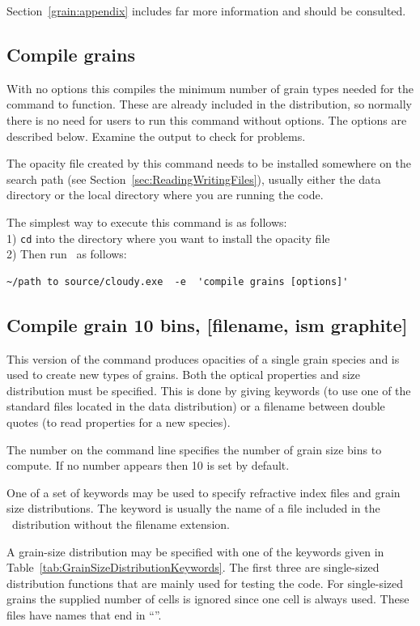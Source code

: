 Section~\ref{grain:appendix} includes far
more information and should be consulted.

\subsection{Compile grains}

With no options this compiles the minimum number of grain types needed
for the  command to function. These are already included
in the distribution, so normally there is no need for users to run this
command without options. The options are described below.
Examine the output to check
for problems. 

The opacity file created by this command needs to be installed somewhere
on the search path (see Section~\ref{sec:ReadingWritingFiles}), usually either
the data directory or the local directory where you are running the code.

The simplest way to execute this command is as follows:\\
1) \texttt{cd} into the directory where you want to install the opacity file\\
2) Then run \Cloudy\ as follows:
\begin{verbatim}
~/path to source/cloudy.exe  -e  'compile grains [options]'
\end{verbatim}

\subsection{Compile grain 10 bins, [filename, ism graphite]}

This version of the command produces opacities of a single grain species
and is used to create new types of grains.
Both the optical properties
and size distribution must be specified.
This is done by giving keywords
(to use one of the standard files located in the data distribution)
or a filename between double quotes (to read properties for a new species).

The number on the command line specifies the number of
grain size bins to compute.
If no number appears then 10 is set by default.

One of a set of keywords may be used to
specify refractive index files and grain size distributions.
The keyword is usually the
name of a file included in the \Cloudy\ distribution
without the filename extension.

A grain-size
distribution may be specified with one of the keywords given in
Table~\ref{tab:GrainSizeDistributionKeywords}.
The first three are single-sized distribution functions that are mainly
used for testing the code.
For single-sized grains the supplied number
of cells is ignored since one cell is always used.
These files have names
that end in ``''.

